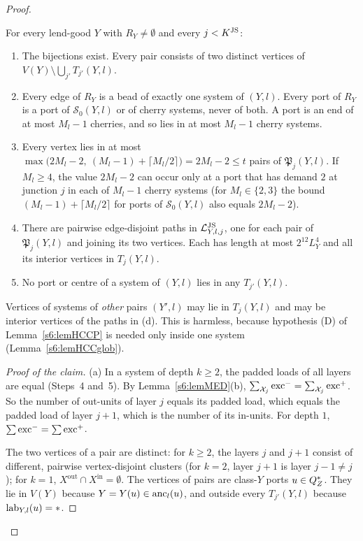 \begin{proof}
\begin{claim}
For every lend-good $Y$ with $R_Y\neq\emptyset$ and every $j<K^{\mathrm{JS}}$:
\begin{enumerate}
\item[(a)] The bijections exist. Every pair consists of two distinct vertices of $V(Y)\setminus\bigcup_{j'}T_{j'}(Y,l)$.
\item[(b)] Every edge of $R_Y$ is a bead of exactly one system of $(Y,l)$. Every port of $R_Y$ is a port of $\mathcal S_0(Y,l)$ or of cherry systems, never of both. A port is an end of at most $M_l-1$ cherries, and so lies in at most $M_l-1$ cherry systems.
\item[(c)] Every vertex lies in at most $\max\bigl(2M_l-2,\ (M_l-1)+\lceil M_l/2\rceil\bigr)=2M_l-2\le t$ pairs of $\mathfrak P_j(Y,l)$. If $M_l\ge4$, the value $2M_l-2$ can occur only at a port that has demand $2$ at junction $j$ in each of $M_l-1$ cherry systems (for $M_l\in\{2,3\}$ the bound $(M_l-1)+\lceil M_l/2\rceil$ for ports of $\mathcal S_0(Y,l)$ also equals $2M_l-2$).
\item[(d)] There are pairwise edge-disjoint paths in $\mathcal{L}^{\mathrm{JS}}_{Y,l,j}$, one for each pair of $\mathfrak P_j(Y,l)$ and joining its two vertices. Each has length at most $2^{12}L_Y^4$ and all its interior vertices in $T_j(Y,l)$.
\item[(e)] No port or centre of a system of $(Y,l)$ lies in any $T_{j'}(Y,l)$.
\end{enumerate}
\end{claim}
Vertices of systems of \emph{other} pairs $(Y',l)$ may lie in $T_j(Y,l)$ and may be interior vertices of the paths in (d). This is harmless, because hypothesis (D) of Lemma~\ref{s6:lemHCCP} is needed only inside one system (Lemma~\ref{s6:lemHCCglob}).

\begin{proof}[Proof of the claim]
(a) In a system of depth $k\ge2$, the padded loads of all layers are equal (Steps~4 and~5). By Lemma~\ref{s6:lemMED}(b), $\sum_{\mathcal{X}_j}\mathrm{exc}^-=\sum_{\mathcal{X}_j}\mathrm{exc}^+$. So the number of out-units of layer $j$ equals its padded load, which equals the padded load of layer $j+1$, which is the number of its in-units. For depth $1$, $\sum\mathrm{exc}^-=\sum\mathrm{exc}^+$.

The two vertices of a pair are distinct: for $k\ge2$, the layers $j$ and $j+1$ consist of different, pairwise vertex-disjoint clusters (for $k=2$, layer $j+1$ is layer $j-1\neq j$); for $k=1$, $X^{\mathrm{out}}\cap X^{\mathrm{in}}=\emptyset$. The vertices of pairs are class-$Y$ ports $u\in Q^{*}_Z$. They lie in $V(Y)$ because $Y=Y(u)\in\mathrm{anc}_l(u)$, and outside every $T_{j'}(Y,l)$ because $\mathrm{lab}_{Y,l}(u)=*$.


\end{proof}
\end{proof}
